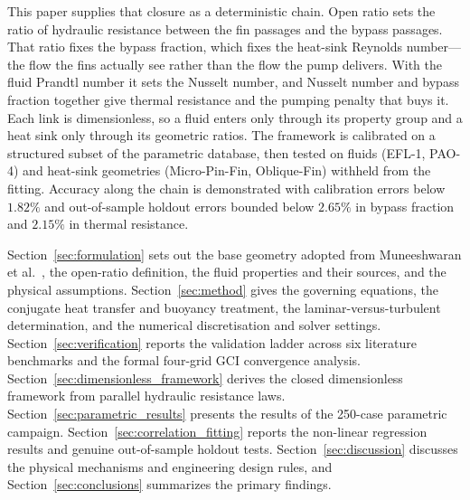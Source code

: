 \documentclass[preprint,12pt]{elsarticle}
\begin{document}
This paper supplies that closure as a deterministic chain. Open ratio sets the ratio of hydraulic resistance
between the fin passages and the bypass passages. That ratio fixes the bypass fraction, which
fixes the heat-sink Reynolds number---the flow the fins actually see rather than the flow the pump
delivers. With the fluid Prandtl number it sets the Nusselt number, and Nusselt number and bypass
fraction together give thermal resistance and the pumping penalty that buys it. Each link is
dimensionless, so a fluid enters only through its property group and a heat sink only through its
geometric ratios. The framework is calibrated on a structured subset of the parametric database, then tested on fluids (EFL-1, PAO-4) and
heat-sink geometries (Micro-Pin-Fin, Oblique-Fin) withheld from the fitting. Accuracy along
the chain is demonstrated with calibration errors below $1.82\%$ and out-of-sample holdout errors bounded below $2.65\%$ in bypass fraction and $2.15\%$ in thermal resistance.

Section~\ref{sec:formulation} sets out the base geometry adopted from Muneeshwaran et
al.~\cite{muneeshwaran2023}, the open-ratio definition, the fluid properties and their sources,
and the physical assumptions. Section~\ref{sec:method} gives the governing equations,
the conjugate heat transfer and buoyancy treatment, the laminar-versus-turbulent determination,
and the numerical discretisation and solver settings. Section~\ref{sec:verification} reports the
validation ladder across six literature benchmarks and the formal four-grid GCI convergence analysis. Section~\ref{sec:dimensionless_framework} derives the closed dimensionless framework from parallel hydraulic resistance laws. Section~\ref{sec:parametric_results} presents the results of the 250-case parametric campaign. Section~\ref{sec:correlation_fitting} reports the non-linear regression results and genuine out-of-sample holdout tests. Section~\ref{sec:discussion} discusses the physical mechanisms and engineering design rules, and Section~\ref{sec:conclusions} summarizes the primary findings.












\end{document}
